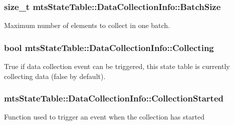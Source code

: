 \subsubsection[{Batch\+Size}]{\setlength{\rightskip}{0pt plus 5cm}size\+\_\+t mts\+State\+Table\+::\+Data\+Collection\+Info\+::\+Batch\+Size}\label{classmts_state_table_1_1_data_collection_info_ac99fb26fa253839f3e56bb5102f50ed4}
Maximum number of elements to collect in one batch. \hypertarget{classmts_state_table_1_1_data_collection_info_a3cba7424d384d2c04aef689839de610f}{}
\subsubsection[{Collecting}]{\setlength{\rightskip}{0pt plus 5cm}bool mts\+State\+Table\+::\+Data\+Collection\+Info\+::\+Collecting}\label{classmts_state_table_1_1_data_collection_info_a3cba7424d384d2c04aef689839de610f}
True if data collection event can be triggered, this state table is currently collecting data (false by default). \hypertarget{classmts_state_table_1_1_data_collection_info_a95b64dcedf855f7881f4903e74101549}{}
\subsubsection[{Collection\+Started}]{ mts\+State\+Table\+::\+Data\+Collection\+Info\+::\+Collection\+Started}\label{classmts_state_table_1_1_data_collection_info_a95b64dcedf855f7881f4903e74101549}
Function used to trigger an event when the collection has started \hypertarget{classmts_state_table_1_1_data_collection_info_ae4ff6ebaf115c070c00ff0686997383f}{}
